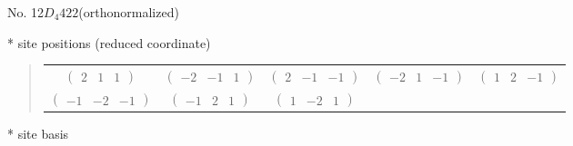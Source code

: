 \documentclass[fleqn,9pt,landscape]{jsarticle}
\begin{document}
\newpage
\begin{center}
\LARGE
No. 12\quad$D_{4}$\quad$422$\quad[ tetragonal ] (orthonormalized)
\end{center}
\vspace{5mm}
* site positions (reduced coordinate)
\begin{quote}
\begin{tabular}{ccccc}
$ \begin{pmatrix} 2 & 1 & 1 \end{pmatrix} $ & $ \begin{pmatrix} -2 & -1 & 1 \end{pmatrix} $ & $ \begin{pmatrix} 2 & -1 & -1 \end{pmatrix} $ & $ \begin{pmatrix} -2 & 1 & -1 \end{pmatrix} $ & $ \begin{pmatrix} 1 & 2 & -1 \end{pmatrix} $ \\
$ \begin{pmatrix} -1 & -2 & -1 \end{pmatrix} $ & $ \begin{pmatrix} -1 & 2 & 1 \end{pmatrix} $ & $ \begin{pmatrix} 1 & -2 & 1 \end{pmatrix} $ & $  $ & $  $
\end{tabular}
\end{quote}
* site basis
\end{document}
